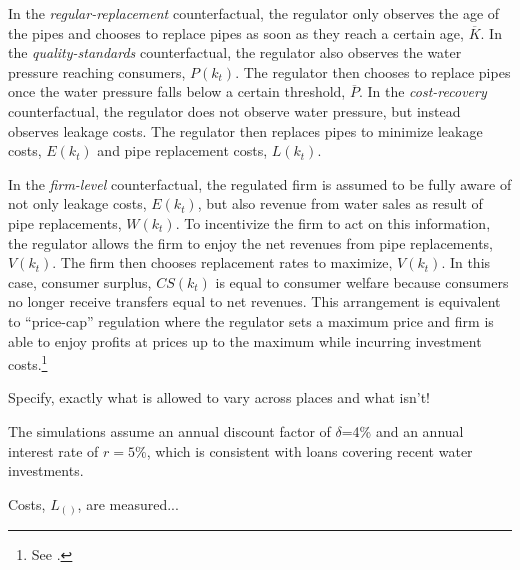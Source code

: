 \documentclass[12pt,table]{article}
\begin{document}


In the \textit{regular-replacement} counterfactual, the regulator only observes the age of the pipes and chooses to replace pipes as soon as they reach a certain age, $\overline{K}$.  In the \textit{quality-standards} counterfactual, the regulator also observes the water pressure reaching consumers, $P(k_t)$.  The regulator then chooses to replace pipes once the water pressure falls below a certain threshold, $\overline{P}$.  In the \textit{cost-recovery} counterfactual, the regulator does not observe water pressure, but instead observes leakage costs.  The regulator then replaces pipes to minimize leakage costs, $E(k_{t})$ and pipe replacement costs, $L(k_{t})$.  


In the \textit{firm-level} counterfactual, the regulated firm is assumed to be fully aware of not only leakage costs, $E(k_t)$, but also revenue from water sales as result of pipe replacements, $W(k_t)$.  To incentivize the firm to act on this information, the regulator allows the firm to enjoy the net revenues from pipe replacements, $V(k_t)$.  The firm then chooses replacement rates to maximize, $V(k_t)$.  In this case, consumer surplus, $CS(k_t)$ is equal to consumer welfare because consumers no longer receive transfers equal to net revenues.  This arrangement is equivalent to ``price-cap'' regulation where the regulator sets a maximum price and firm is able to enjoy profits at prices up to the maximum while incurring investment costs.\footnote{See \cite{joskow2007regulation}.}




Specify, exactly what is allowed to vary across places and what isn't!

The simulations assume an annual discount factor of $\delta$=4\% and an annual interest rate of $r=5\%$, which is consistent with loans covering recent water investments.  


Costs, $L_()$, are measured... 





\end{document}
